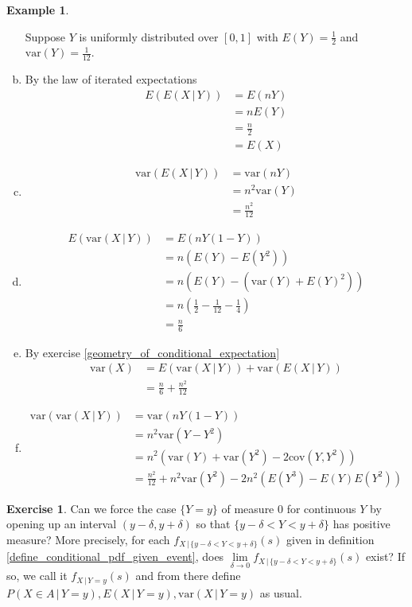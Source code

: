 \documentclass[12pt]{amsart}
\theoremstyle{definition}
\newtheorem{example}[theorem]{Example}
\newtheorem{exercise}[theorem]{Exercise}
\begin{document}
\begin{example}
\begin{enumerate}[a.]
Suppose $Y$ is uniformly distributed over $[0,1]$ with $E(Y) = \frac{1}{2}$ and $\text{var}(Y) = \frac{1}{12}$.
\item By the law of iterated expectations
\begin{align*}
E(E(X \,|\, Y)) & = E(nY) \\
 & = nE(Y) \\
 & = \frac{n}{2} \\
 & = E(X)
\end{align*}
\item
\begin{align*}
\text{var}(E(X \,|\, Y)) & = \text{var}(nY) \\
 & = n^2 \text{var}(Y) \\
 & = \frac{n^2}{12}
\end{align*}
\item
\begin{align*}
E(\text{var}(X \,|\, Y)) & = E(nY(1-Y)) \\
 & = n(E(Y) - E(Y^2)) \\
 & = n(E(Y) - (\text{var}(Y) + E(Y)^2)) \\
 & = n(\frac{1}{2} - \frac{1}{12} - \frac{1}{4}) \\
 & = \frac{n}{6}
\end{align*}
\item By exercise \ref{geometry_of_conditional_expectation}
\begin{align*}
\text{var}(X) & = E(\text{var}(X \,|\, Y)) + \text{var}(E(X \,|\, Y)) \\
 &  = \frac{n}{6} + \frac{n^2}{12}
\end{align*}
\item
\begin{align*}
\text{var}(\text{var}(X \,|\, Y)) & = \text{var}(nY(1-Y)) \\
 & = n^2 \text{var}(Y - Y^2) \\
 & = n^2(\text{var}(Y) + \text{var}(Y^2) - 2\text{cov}(Y, Y^2)) \\
 & = \frac{n^2}{12} + n^2\text{var}(Y^2) - 2n^2(E(Y^3) - E(Y)E(Y^2))
\end{align*}
\end{enumerate}
\end{example}

\begin{exercise} Can we force the case $\{Y = y\}$ of measure 0 for continuous $Y$ by opening up an interval $(y - \delta, y + \delta)$ so that $\{y - \delta < Y < y + \delta\}$ has positive measure? More precisely, for each $f_{X \,|\, \{y - \delta < Y < y + \delta\}}(s)$ given in definition \ref{define_conditional_pdf_given_event}, does $\lim\limits_{\delta \to 0} f_{X \,|\, \{y - \delta < Y < y + \delta\}}(s)$ exist? If so, we call it $f_{X \,|\, Y = y}(s)$ and from there define $P(X \in A \,|\, Y = y), E(X \,|\, Y = y), \text{var}(X \,|\, Y = y)$ as usual.
\end{exercise}
\end{document}
